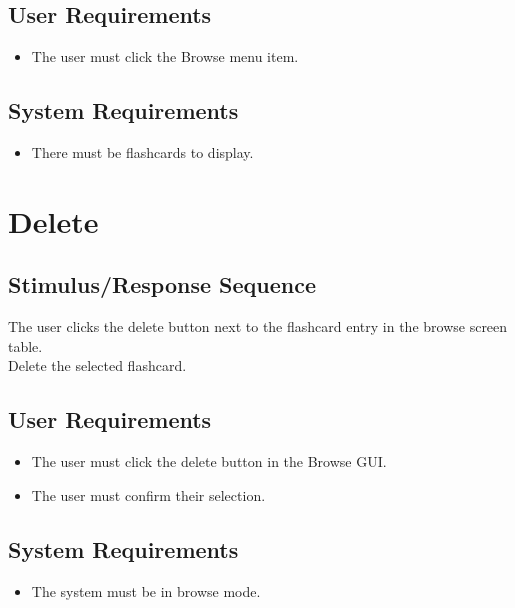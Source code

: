 \documentclass{scrreprt}
\begin{document}
    \subsection*{User Requirements}
        \begin{itemize}
            \item The user must click the Browse menu item.
        \end{itemize}

    \subsection*{System Requirements}
        \begin{itemize}
            \item There must be flashcards to display.
        \end{itemize}

\section{Delete}
    \subsection*{Stimulus/Response Sequence}
        \begin{flushleft}
             The user clicks the delete button next to the flashcard entry in the browse screen table. \\
             Delete the selected flashcard. \\
        \end{flushleft}

    \subsection*{User Requirements}
        \begin{itemize}
            \item The user must click the delete button in the Browse GUI.
            \item The user must confirm their selection.
        \end{itemize}

    \subsection*{System Requirements}
        \begin{itemize}
            \item The system must be in browse mode.
        \end{itemize}
\end{document}
